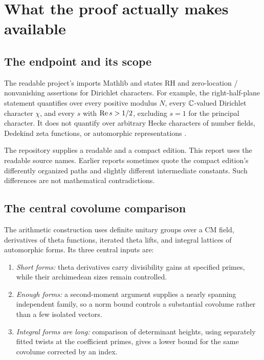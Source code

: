 \section{What the proof actually makes available}
\label{sec:architecture}

\subsection{The endpoint and its scope}

The readable project's  imports Mathlib and states
RH and zero-location / nonvanishing assertions for Dirichlet characters.
For example, the right-half-plane statement quantifies over every
positive modulus \(N\), every \(\mathbb C\)-valued Dirichlet character \(\chi\),
and every \(s\) with \(\operatorname{Re} s>1/2\), excluding \(s=1\) for the principal
character. It does not quantify over arbitrary Hecke characters of number
fields, Dedekind zeta functions, or automorphic representations
\cite{statements}.

The repository supplies a readable and a compact edition. This report uses
the readable source names. Earlier reports sometimes quote the compact
edition's differently organized paths and slightly different intermediate
constants. Such differences are not mathematical contradictions.

\subsection{The central covolume comparison}

The arithmetic construction uses definite unitary groups over a CM field,
derivatives of theta functions, iterated theta lifts, and integral lattices
of automorphic forms. Its three central inputs are:
\begin{enumerate}[leftmargin=*,itemsep=3pt]
\item \emph{Short forms:} theta derivatives carry divisibility gains at
specified primes, while their archimedean sizes remain controlled.
\item \emph{Enough forms:} a second-moment argument supplies a nearly
spanning independent family, so a norm bound controls a substantial
covolume rather than a few isolated vectors.
\item \emph{Integral forms are long:} comparison of determinant heights,
using separately fitted twists at the coefficient primes, gives a lower
bound for the same covolume corrected by an index.
\end{enumerate}

